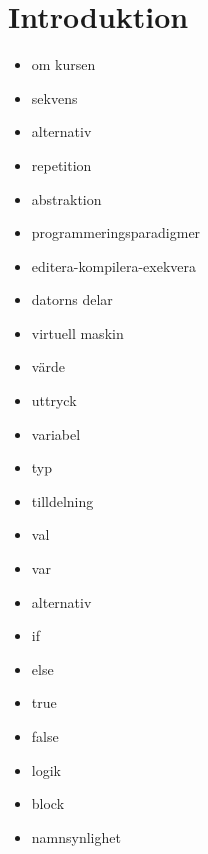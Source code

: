 \chapter{Introduktion}
\begin{itemize}[nosep]
\item om kursen
\item sekvens
\item alternativ
\item repetition
\item abstraktion
\item programmeringsparadigmer
\item editera-kompilera-exekvera
\item datorns delar
\item virtuell maskin
\item värde
\item uttryck
\item variabel
\item typ
\item tilldelning
\item val
\item var
\item alternativ
\item if
\item else
\item true
\item false
\item logik
\item block
\item namnsynlighet\end{itemize}